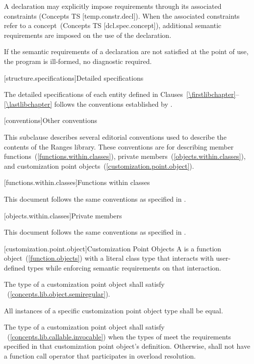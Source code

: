 \pnum
A declaration may explicitly impose requirements through its associated
constraints (Concepts TS [temp.constr.decl]). When the associated constraints
refer to a concept~(Concepts TS [dcl.spec.concept]), additional semantic requirements are
imposed on the use of the declaration.

\pnum
If the semantic requirements of a declaration are not satisfied at the
point of use, the program is ill-formed, no diagnostic required.

[structure.specifications]{Detailed specifications}

\pnum
The detailed specifications of each entity defined in
Clauses~\ref{\firstlibchapter}--\ref{\lastlibchapter} follows the conventions
established by .

[conventions]{Other conventions}
%

\pnum
This subclause describes several editorial conventions used to describe the contents
of the Ranges library. These conventions are for describing
member functions~(\ref{functions.within.classes}),
private members~(\ref{objects.within.classes}),
and customization point objects~(\ref{customization.point.object}).

[functions.within.classes]{Functions within classes}

\pnum
This document follows the same conventions as specified in .

[objects.within.classes]{Private members}

\pnum
This document follows the same conventions as specified in .

[customization.point.object]{Customization Point Objects}
\pnum
A  is a function object~(\ref{function.objects}) with a
literal class type that interacts with user-defined types while
enforcing semantic requirements on that interaction.

\pnum
The type of a customization point object shall satisfy
~(\ref{concepts.lib.object.semiregular}).

\pnum
All instances of a specific customization point object type shall
be equal.

\pnum
The type of a customization point object  shall satisfy
~(\ref{concepts.lib.callable.invocable}) when the types of
 meet the requirements specified in that
customization point object's definition. Otherwise, 
shall not have a function call operator that participates in
overload resolution.

